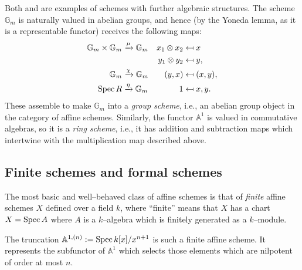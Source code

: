 \begin{remark}
Both  and  are examples of schemes with further algebraic structures.  The scheme $\mathbb G_m$ is naturally valued in abelian groups, and hence (by the Yoneda lemma, as it is a representable functor) receives the following maps:
\begin{align*}
\mathbb G_m \times \mathbb G_m & \xrightarrow{\mu} \mathbb G_m & x_1 \otimes x_2 & \mapsfrom x \\
& & y_1 \otimes y_2 & \mapsfrom y, \\
\mathbb G_m & \xrightarrow{\chi} \mathbb G_m & (y, x) & \mapsfrom (x, y), \\
\operatorname{Spec} R & \xrightarrow{\eta} \mathbb G_m & 1 & \mapsfrom x, y.
\end{align*}
These assemble to make $\mathbb G_m$ into a \textit{group scheme}, i.e., an abelian group object in the category of affine schemes.  Similarly, the functor $\mathbb A^1$ is valued in commutative algebras, so it is a \textit{ring scheme}, i.e., it has addition and subtraction maps which intertwine with the multiplication map described above.
\end{remark}

\subsection{Finite schemes and formal schemes}

The most basic and well--behaved class of affine schemes is that of \textit{finite} affine schemes $X$ defined over a field $k$, where ``finite'' means that $X$ has a chart $X = \operatorname{Spec} A$ where $A$ is a $k$--algebra which is finitely generated as a $k$--module.
\begin{example}\label{DefnA1n}
The truncation $\mathbb A^{1, (n)} := \operatorname{Spec} k[x] / x^{n+1}$ is such a finite affine scheme.  It represents the subfunctor of $\mathbb A^1$ which selects those elements which are nilpotent of order at most $n$.
\end{example}


